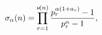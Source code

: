\[\mathop{\sigma_{\alpha}\/}\nolimits\!\left(n\right)=\prod_{r=1}^{\mathop{\nu\/%
}\nolimits\!\left(n\right)}\frac{p^{\alpha(1+a_{r})}_{r}-1}{p^{\alpha}_{r}-1},\]